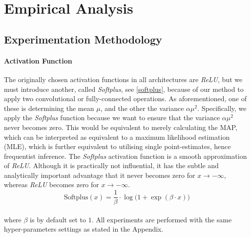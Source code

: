 \chapter{Empirical Analysis}


\pagebreak

\section{Experimentation Methodology} \label{experiments}

\subsubsection{Activation Function}

The originally chosen activation functions in all architectures are \textit{ReLU}, but we must introduce another, called \textit{Softplus}, see \eqref{softplus}, because of our method to apply two convolutional or fully-connected operations. As aforementioned, one of these is determining the mean $\mu$, and the other the variance $\alpha \mu^2$. Specifically, we apply the \textit{Softplus} function because we want to ensure that the variance $\alpha \mu^2$ never becomes zero. This would be equivalent to merely calculating the MAP, which can be interpreted as equivalent to a maximum likelihood estimation (MLE), which is further equivalent to utilising single point-estimates, hence frequentist inference. The \textit{Softplus} activation function is a smooth approximation of \textit{ReLU}. Although it is practically not influential, it has the subtle and analytically important advantage that it never becomes zero for $x \rightarrow -\infty$, whereas \textit{ReLU} becomes zero for $x \rightarrow -\infty$.
\\ 
\begin{equation}\label{softplus}
     \text{Softplus}(x) = \frac{1}{\beta} \cdot \log \big ( 1 + \exp(\beta \cdot x) \big )
\end{equation}
\\
where $\beta$ is by default set to $1$.
\newline All experiments are performed with the same hyper-parameters settings as stated in the Appendix.

